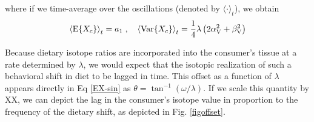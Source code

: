 \documentclass{frontiersSCNS}
\begin{document}
\noindent where if we time-average over the oscillations (denoted by $\langle \cdot \rangle_t$), we obtain
\begin{equation}
\label{EX-VX-sin-timeaverage}
\left\langle {\rm E}\{X_c\}\right\rangle_t = a_1\;,\quad \left\langle{\rm Var}\{X_c\}\right\rangle_t = \frac{1}{4}\lambda\left(2 \alpha_{\rm V}^2+\beta_{\rm V}^2\right)
\end{equation}



Because dietary isotope ratios are incorporated into the consumer's tissue at a rate determined by $\lambda$, we would expect that the isotopic realization of such a behavioral shift in diet to be lagged in time.
This offset as a function of $\lambda$ appears directly in Eq \ref{EX-sin} as $\theta = \tan^{-1}{(\omega/\lambda)}$.
If we scale this quantity by XX, we can depict the lag in the consumer's isotope value in proportion to the frequency of the dietary shift, as depicted in Fig. \ref{figoffset}.



\end{document}
